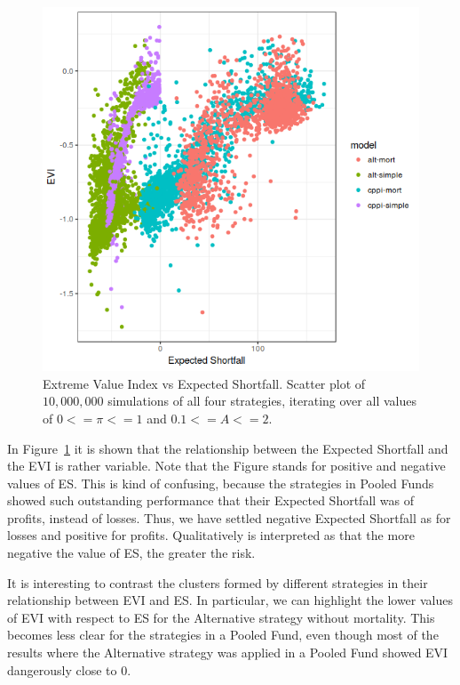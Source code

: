 \begin{figure}[h]
    \centering
    \includegraphics[scale=0.75]{images/evi-es_new2.png}
    \caption{Extreme Value Index vs Expected Shortfall. Scatter plot of $10,000,000$ simulations of all four strategies, iterating over all values of $0 <= \pi <= 1$ and $0.1 <= A <= 2$.}
    \label{fig:evi-es}
\end{figure}

In Figure~\ref{fig:evi-es} it is shown that the relationship between the Expected Shortfall and the EVI is rather variable. Note that the Figure stands for positive and negative values of ES. This is kind of confusing, because the strategies in Pooled Funds showed such outstanding performance that their Expected Shortfall was of profits, instead of losses. Thus, we have settled negative Expected Shortfall as for losses and positive for profits. Qualitatively is interpreted as that the more negative the value of ES, the greater the risk.

It is interesting to contrast the clusters formed by different strategies in their relationship between EVI and ES. In particular, we can highlight the lower values of EVI with respect to ES for the Alternative strategy without mortality. This becomes less clear for the strategies in a Pooled Fund, even though most of the results where the Alternative strategy was applied in a Pooled Fund showed EVI dangerously close to $0$.

